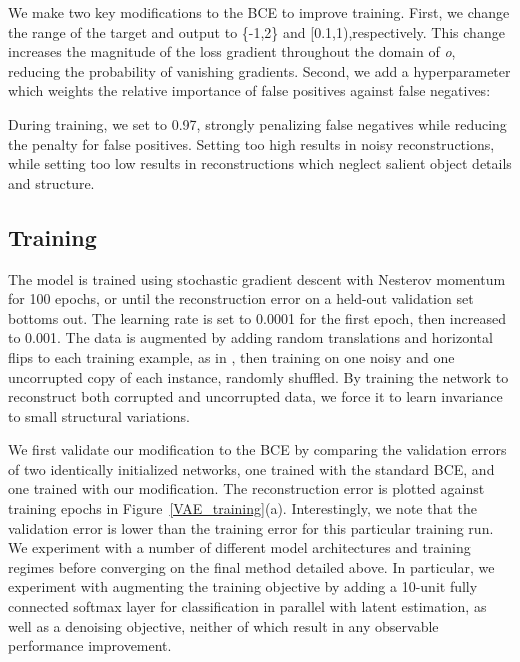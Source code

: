 \documentclass{article}
\begin{document}
We make two key modifications to the BCE to improve training. First, we change the range of the target and output to \{-1,2\} and [0.1,1),respectively. This change increases the magnitude of the loss gradient throughout the domain of \textit{o}, reducing the probability of vanishing gradients. Second, we add a hyperparameter  which weights the relative importance of false positives against false negatives:

\begin{center}\end{center}

During training, we set  to 0.97, strongly penalizing false negatives while reducing the penalty for false positives. Setting  too high results in noisy reconstructions, while setting  too low results in reconstructions which neglect salient object details and structure.

\subsection{Training}

The model is trained using stochastic gradient descent with Nesterov momentum \citep{Nesterov} for 100 epochs, or until the reconstruction error on a held-out validation set bottoms out. The learning rate is set to 0.0001 for the first epoch, then increased to 0.001. The data is augmented by adding random translations and horizontal flips to each training example, as in \citep{VoxNet}, then training on one noisy and one uncorrupted copy of each instance, randomly shuffled. By training the network to reconstruct both corrupted and uncorrupted data, we force it to learn invariance to small structural variations.

We first validate our modification to the BCE by comparing the validation errors of two identically initialized networks, one trained with the standard BCE, and one trained with our modification. The reconstruction error is plotted against training epochs in Figure~\ref{VAE_training}(a). Interestingly, we note that the validation error is lower than the training error for this particular training run. We experiment with a number of different model architectures and training regimes before converging on the final method detailed above. In particular, we experiment with augmenting the training objective by adding a 10-unit fully connected softmax layer for classification in parallel with latent estimation, as well as a denoising objective, neither of which result in any observable performance improvement.
\end{document}
